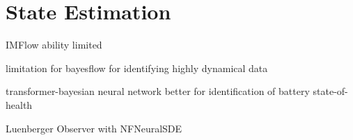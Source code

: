 \section{State Estimation}
\label{sec:methods:state_estimation}

IMFlow ability limited

limitation for bayesflow for identifying highly dynamical data

transformer-bayesian neural network
better for identification of battery state-of-health

Luenberger Observer with NFNeuralSDE


